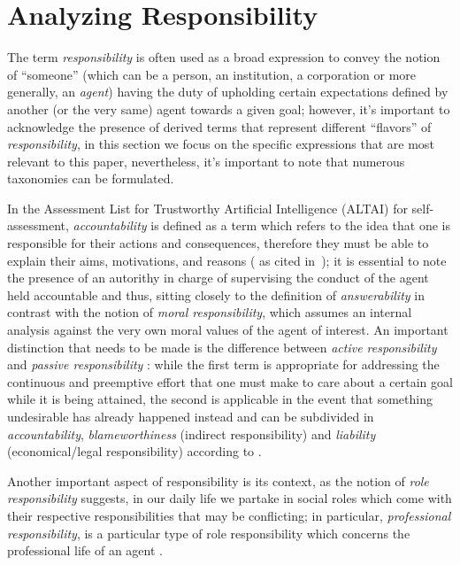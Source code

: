 \section{Analyzing Responsibility}\label{sec:responsibility}

The term \textit{responsibility} is often used as a broad expression to convey the notion of ``someone'' (which can be a person, an institution, a corporation or more generally, an \textit{agent}) having the duty of upholding certain expectations defined by another (or the very same) agent towards a given goal; however, it's important to acknowledge the presence of derived terms that represent different ``flavors'' of \textit{responsibility}, in this section we focus on the specific expressions that are most relevant to this paper, nevertheless, it's important to note that numerous taxonomies can be formulated.

In the Assessment List for Trustworthy Artificial Intelligence (ALTAI) for self-assessment, \textit{accountability} is defined as a term which refers to the idea that one is responsible for their actions and consequences, therefore they must be able to explain their aims, motivations, and reasons (\cite{ALTAI} as cited in~\cite{NOVAIA}); it is essential to note the presence of an autorithy in charge of supervising the conduct of the agent held accountable and thus, sitting closely to the definition of \textit{answerability} \parencite{NISAIA} in contrast with the notion of \textit{moral responsibility}, which assumes an internal analysis against the very own moral values of the agent of interest.
An important distinction that needs to be made is the difference between \textit{active responsibility} and \textit{passive responsibility} \parencite{ETE}: while the first term is appropriate for addressing the continuous and preemptive effort that one must make to care about a certain goal while it is being attained, the second is applicable in the event that something undesirable has already happened instead and can be subdivided in \textit{accountability}, \textit{blameworthiness} (indirect responsibility) and \textit{liability} (economical/legal responsibility) according to \parencite{ETE}.

Another important aspect of responsibility is its context, as the notion of \textit{role responsibility} suggests, in our daily life we partake in social roles which come with their respective responsibilities that may be conflicting; in particular, \textit{professional responsibility}, is a particular type of role responsibility which concerns the professional life of an agent \parencite{ETE}.

